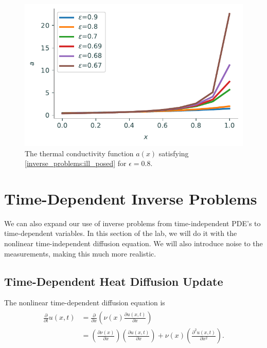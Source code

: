 \begin{figure}[H]
\centering
\includegraphics[width=\textwidth]{figures/ill_posed_density_a.pdf}
\caption{The thermal conductivity function $a(x)$ satisfying \eqref{inverse_problems:ill_posed} for $\epsilon = 0.8$.}
\label{fig:inverse_problems:exercise1}
\end{figure}

\section*{Time-Dependent Inverse Problems}
We can also expand our use of inverse problems from time-independent PDE's to time-dependent variables. In this section of the lab, we will do it with the nonlinear time-independent diffusion equation. We will also introduce noise to the measurements, making this much more realistic.

\subsection*{Time-Dependent Heat Diffusion Update}
The nonlinear time-dependent diffusion equation is
\begin{align}
\begin{split}
\frac{\partial}{\partial t}u(x,t) &= \frac{\partial}{\partial x}\left(\nu(x)\frac{\partial u(x,t)}{\partial x}\right)\\
&= \left(\frac{\partial\nu(x)}{\partial x}\right)\left(\frac{\partial u(x,t)}{\partial x}\right)+\nu(x)\left(\frac{\partial^2 u(x,t)}{\partial x^2}\right).
\end{split}
\label{eqn:inverse:nonlinear_diffusion}
\end{align}

